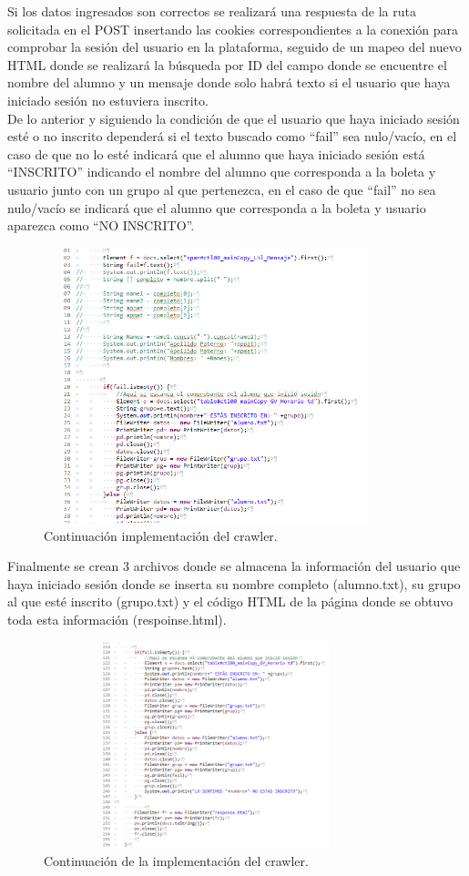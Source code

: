 	\noindent Si los datos ingresados son correctos se realizará una respuesta de la ruta solicitada en el POST insertando las cookies correspondientes a la conexión para comprobar la sesión del usuario en la plataforma, seguido de un mapeo del nuevo HTML donde se realizará la búsqueda por ID del campo donde se encuentre el nombre del alumno y un mensaje donde solo habrá texto si el usuario que haya iniciado sesión no estuviera inscrito.\\
	\noindent De lo anterior y siguiendo la condición de que el usuario que haya iniciado sesión esté o no inscrito dependerá si el texto buscado como “fail” sea nulo/vacío, en el caso de que no lo esté indicará que el alumno que haya iniciado sesión está “INSCRITO” indicando el nombre del alumno que corresponda a la boleta y usuario junto con un grupo al que pertenezca, en el caso de que “fail” no sea nulo/vacío se indicará que el alumno que corresponda a la boleta y usuario aparezca como “NO INSCRITO”. \\
	\begin{figure}[hbt!]
		\centering
		\includegraphics[width=10cm, height=8cm]{Imagenes/Crawler/Codigo4}
		\caption{Continuación implementación del crawler.}
		\label{codigo4}
	\end{figure}

	\noindent Finalmente se crean 3 archivos donde se almacena la información del usuario que haya iniciado sesión donde se inserta su nombre completo (alumno.txt), su grupo al que esté inscrito (grupo.txt) y el código HTML de la página donde se obtuvo toda esta información (respoinse.html).
\pagebreak

	\begin{figure}[hbt!]
		\centering
		\includegraphics[width=10cm, height=6cm]{Imagenes/Crawler/Codigo5}
		\caption{Continuación de la implementación del crawler.}
		\label{codigo5}
	\end{figure}


